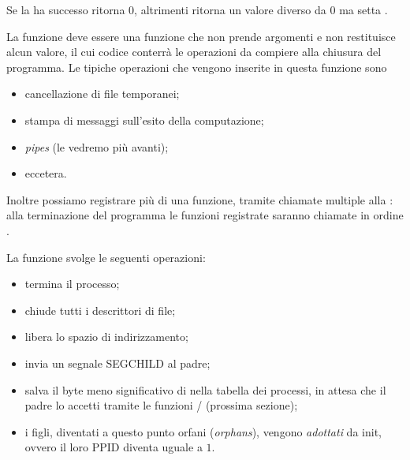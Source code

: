 Se la  ha successo ritorna $0$, altrimenti ritorna un valore diverso da $0$ ma  setta .

La funzione  deve essere una funzione che non prende argomenti e non restituisce alcun valore, il cui codice conterrà le operazioni da compiere alla chiusura del programma. Le tipiche operazioni che vengono inserite in questa funzione sono \begin{itemize}
    \item cancellazione di file temporanei;
    \item stampa di messaggi sull'esito della computazione;
    \item \emph{pipes} (le vedremo più avanti);
    \item eccetera.
\end{itemize}

Inoltre possiamo registrare più di una funzione, tramite chiamate multiple alla : alla terminazione del programma le funzioni registrate saranno chiamate in ordine .

La funzione  svolge le seguenti operazioni: \begin{itemize}
    \item termina il processo;
    \item chiude tutti i descrittori di file;
    \item libera lo spazio di indirizzamento;
    \item invia un segnale \textsf{SEGCHILD} al padre;
    \item salva il byte meno significativo di  nella tabella dei processi, in attesa che il padre lo accetti tramite le funzioni / (prossima sezione);
    \item i figli, diventati a questo punto orfani (\emph{orphans}), vengono \emph{adottati} da \textsf{init}, ovvero il loro \textsf{PPID} diventa uguale a $1$. 
\end{itemize}